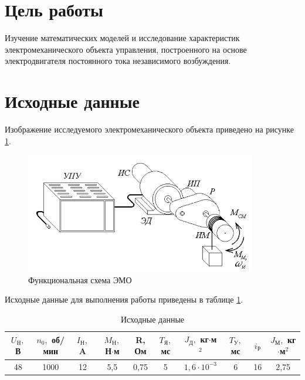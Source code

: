 \documentclass[fleqn, a4paper, 11pt, russian]{article}
\begin{document}
    
    \section*{Цель работы}
    Изучение математических моделей и исследование характеристик электромеханического объекта управления, построенного на основе электродвигателя постоянного тока независимого возбуждения.
    \section*{Исходные данные}
    Изображение исследуемого электромеханического объекта приведено на рисунке \ref{EMOim}.
    \begin{figure}[ht!]
    	\centering
    	\includegraphics[width = 0.9\textwidth]{EMOImage}
    	\caption{Функциональная схема ЭМО}
    	\label{EMOim}
    \end{figure}
    
    Исходные данные для выполнения работы приведены в таблице \ref{initTab}.
    \begin{table}[ht!]
    	\caption{Исходные данные}
    	\begin{tabular}{| c | c | c | c | c | c | c | c | c | c |}
    		\hline
    		\makecell{$U_\text{Н},$\\В} & \makecell{$n_0,$\\об/мин} & \makecell{$I_\text{Н},$\\A} & \makecell{$M_\text{Н},$\\Н$\cdot$м} & \makecell{R,\\Ом} & \makecell{$T_\text{Я},$\\мс} & \makecell{$J_\text{Д},$\\кг$\cdot$м$^2$} & \makecell{$T_\text{У},$\\мс} & $i_\text{Р}$ & \makecell{$J_\text{М},$\\кг$\cdot$м$^2$} \\
    		\hline
    		48 & 1000 & 12 & 5,5 & 0,75 & 5 & $1,6\cdot10^{-3}$ & 6 & 16 & 2,75\\
    		\hline
    	\end{tabular}
    	\label{initTab}
    \end{table}
    \clearpage
\end{document}
